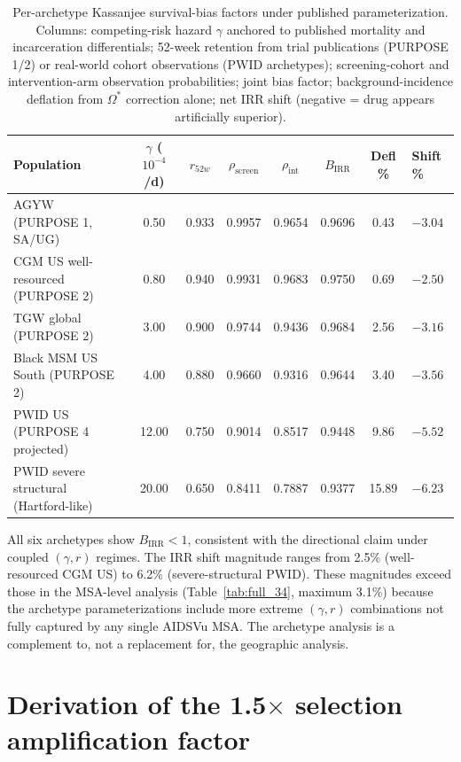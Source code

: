 \documentclass[11pt]{article}
\begin{document}
\begin{table}[H]
\centering
\small
\caption{Per-archetype Kassanjee survival-bias factors under published parameterization. Columns: competing-risk hazard $\gamma$ anchored to published mortality and incarceration differentials; 52-week retention from trial publications (PURPOSE 1/2) or real-world cohort observations (PWID archetypes); screening-cohort and intervention-arm observation probabilities; joint bias factor; background-incidence deflation from $\Omega^*$ correction alone; net IRR shift (negative = drug appears artificially superior).}
\label{tab:subpop}
\begin{tabular}{lccccccl}
\toprule
Population & $\gamma$ ($10^{-4}$/d) & $r_{52w}$ & $\rho_{\mathrm{screen}}$ & $\rho_{\mathrm{int}}$ & $B_{\mathrm{IRR}}$ & Defl \% & Shift \% \\
\midrule
AGYW (PURPOSE 1, SA/UG) & 0.50 & 0.933 & 0.9957 & 0.9654 & 0.9696 & 0.43 & $-3.04$ \\
CGM US well-resourced (PURPOSE 2) & 0.80 & 0.940 & 0.9931 & 0.9683 & 0.9750 & 0.69 & $-2.50$ \\
TGW global (PURPOSE 2) & 3.00 & 0.900 & 0.9744 & 0.9436 & 0.9684 & 2.56 & $-3.16$ \\
Black MSM US South (PURPOSE 2) & 4.00 & 0.880 & 0.9660 & 0.9316 & 0.9644 & 3.40 & $-3.56$ \\
PWID US (PURPOSE 4 projected) & 12.00 & 0.750 & 0.9014 & 0.8517 & 0.9448 & 9.86 & $-5.52$ \\
PWID severe structural (Hartford-like) & 20.00 & 0.650 & 0.8411 & 0.7887 & 0.9377 & 15.89 & $-6.23$ \\
\bottomrule
\end{tabular}
\vspace{0.3em}
\footnotesize
\begin{flushleft}
All six archetypes show $B_{\mathrm{IRR}} < 1$, consistent with the directional claim under coupled $(\gamma, r)$ regimes. The IRR shift magnitude ranges from 2.5\% (well-resourced CGM US) to 6.2\% (severe-structural PWID). These magnitudes exceed those in the MSA-level analysis (Table~\ref{tab:full_34}, maximum 3.1\%) because the archetype parameterizations include more extreme $(\gamma, r)$ combinations not fully captured by any single AIDSVu MSA. The archetype analysis is a complement to, not a replacement for, the geographic analysis.
\end{flushleft}
\end{table}

\section{Derivation of the \texorpdfstring{1.5$\times$}{1.5x} selection amplification factor}\label{sec:selection_derivation}
\end{document}
